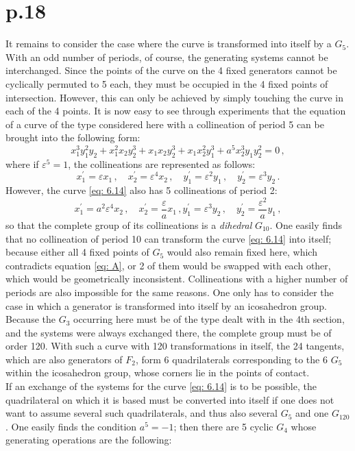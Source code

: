 \documentclass[leqno]{article}
\begin{document}
\section{p.18}
It remains to consider the case where the curve is transformed into itself by a $G_5$. With an odd number of periods, of course, the generating systems cannot be interchanged. Since the points of the curve on the 4 fixed generators cannot be cyclically permuted to 5 each, they must be occupied in the 4 fixed points of intersection. However, this can only be achieved by simply touching the curve in each of the 4 points. It is now easy to see through experiments that the equation of a curve of the type considered here with a collineation of period 5 can be brought into the following form: 
\begin{equation}\label{eq: 6.14}
x_1^3 y_1^2 y_2 + x_1^2 x_2 y_2^3 + x_1 x_2 y_2^3 + x_1 x_2^2 y_1^3 + a^5 x_2^3 y_1 y_2^2 = 0 \, , \tag{14}
\end{equation}
where if $\varepsilon^5=1 $, the collineations are represented as follows:
\[
x_1^\prime = \varepsilon x_1 \, , \quad x_2^\prime = \varepsilon^4 x_2 \, , \quad y_1^\prime = \varepsilon^2 y_1 \, , \quad y_2^\prime = \varepsilon^3 y_2 \, . 
\]
However, the curve \eqref{eq: 6.14} also has 5 collineations of period 2: 
\[
x_1^\prime = a^2 \varepsilon^4 x_2 \, , \quad x_2^\prime = \frac{\varepsilon}{a} x_1 \, , y_1^\prime = \varepsilon^3 y_2 \, , \quad y_2^\prime = \frac{\varepsilon^2}{a} y_1 \, , 
\]
so that the complete group of its collineations is a \textit{dihedral} $G_{10}$. One easily finds that no collineation of period 10 can transform the curve \eqref{eq: 6.14} into itself; because either all 4 fixed points of $G_5$ would also remain fixed here, which contradicts equation \eqref{eq: A}, or 2 of them would be swapped with each other, which would be geometrically inconsistent. Collineations with a higher number of periods are also impossible for the same reasons. One only has to consider the case in which a generator is transformed into itself by an icosahedron group. Because the $G_3$ occurring here must be of the type dealt with in the 4th section, and the systems were always exchanged there, the complete group must be of order 120. With such a curve with 120 transformations in itself, the 24 tangents, which are also generators of $F_2$, form 6 quadrilaterals corresponding to the 6 $G_5$ within the icosahedron group, whose corners lie in the points of contact. \\
If an exchange of the systems for the curve \eqref{eq: 6.14} is to be possible, the quadrilateral on which it is based must be converted into itself if one does not want to assume several such quadrilaterals, and thus also several $G_5$ and one $G_{120}$. One easily finds the condition $a^5=-1$; then there are 5 cyclic $G_4$ whose generating operations are the following: 
\end{document}
